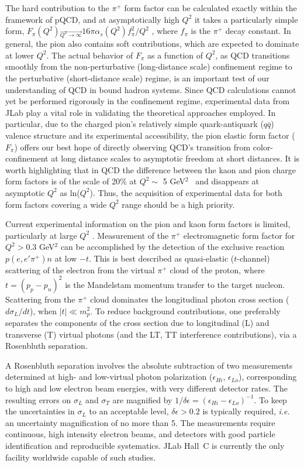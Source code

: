 \documentclass[letterpaper,12pt]{article}
\begin{document}
The hard contribution to the $\pi^+$ form factor can be calculated exactly within the framework of pQCD, and at asymptotically high $Q^2$ it takes a particularly simple form, $F_{\pi}(Q^2) \overrightarrow{_{Q^2 \rightarrow \infty}} 16 \pi \alpha_s(Q^2)f_{\pi}^2/Q^2$ \cite{PETERLEPAGE1979359}, where $f_{\pi}$ is the $\pi^+$ decay constant.  In general, the pion also contains soft contributions, which are expected to dominate at lower $Q^2$. The actual behavior of $F_{\pi}$ as a function of $Q^2$, as QCD transitions smoothly from the non-perturbative (long-distance scale) confinement regime to the perturbative (short-distance scale) regime, is an important test of our understanding of QCD in bound hadron systems. Since QCD calculations cannot yet be performed rigorously in the confinement regime, experimental data from JLab play a vital role in validating the theoretical approaches employed. In particular, due to the charged pion's relatively simple quark-antiquark ($q\bar{q}$) valence structure and its experimental accessibility, the pion elastic form factor ($F_{\pi}$) offers our best hope of directly observing QCD's transition from color-confinement at long distance scales to asymptotic freedom at short distances. It is worth highlighting that in QCD the difference between the kaon and pion charge form factors is of the scale of 20\% at $Q^2 \sim$ 5 GeV$^2$~\cite{Gao:2017mmp} and disappears at asymptotic $Q^2$ as ln($Q^2$).  Thus, the acquisition of experimental data for both form factors covering a wide $Q^2$ range should be a high priority.

Current experimental information on the pion and kaon form factors is limited, particularly at large $Q^2$ \cite{Horn:2016rip}. Measurement of the $\pi^+$ electromagnetic form factor for $Q^2>0.3$ GeV$^2$ can be accomplished by the detection of the exclusive reaction $p(e,e'\pi^+)n$ at low $-t$. This is best described as quasi-elastic ($t$-channel) scattering of the electron from the virtual $\pi^+$ cloud of the proton, where $t=(p_{p}-p_{n})^2$ is the Mandelstam momentum transfer to the target nucleon. Scattering from the $\pi^+$ cloud dominates the longitudinal photon cross section ($d\sigma_L/dt$),  when $|t|\ll m_p^2$. To reduce background contributions, one preferably separates the components of the cross section due to longitudinal (L) and transverse (T) virtual photons (and the LT, TT interference contributions), via a Rosenbluth separation.  

A Rosenbluth separation involves the absolute subtraction of two measurements determined at high- and low-virtual photon polarization ($\epsilon_{Hi}$, $\epsilon_{Lo}$), corresponding to high and low electron beam energies, with very different detector rates. The resulting errors on $\sigma_L$ and $\sigma_T$ are magnified by $1/\delta\epsilon=(\epsilon_{Hi}-\epsilon_{Lo})^{-1}$. To keep the uncertainties in $\sigma_L$ to an acceptable level, $\delta\epsilon >0.2$ is typically required, {\it i.e.} an uncertainty magnification of no more than 5. The measurements require continuous, high intensity electron beams, and detectors with good particle identification and reproducible systematics. JLab Hall~C is currently the only facility worldwide capable of such studies.  
\end{document}
